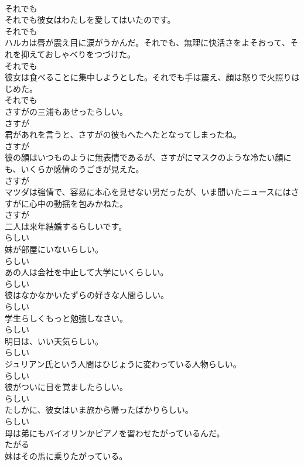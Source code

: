 \documentclass[8pt]{extreport}
\begin{document}
\begin{CJK}{UTF8}{min}
\\	それでも
\\	それでも彼女はわたしを愛してはいたのです。	
\\	それでも
\\	ハルカは唇が震え目に涙がうかんだ。それでも、無理に快活さをよそおって、それを抑えておしゃべりをつづけた。	
\\	それでも
\\	彼女は食べることに集中しようとした。それでも手は震え、顔は怒りで火照りはじめた。	
\\	それでも
\\	さすがの三浦もあせったらしい。	
\\	さすが
\\	君があれを言うと、さすがの彼もへたへたとなってしまったね。	
\\	さすが
\\	彼の顔はいつものように無表情であるが、さすがにマスクのような冷たい顔にも、いくらか感情のうごきが見えた。	
\\	さすが
\\	マツダは強情で、容易に本心を見せない男だったが、いま聞いたニュースにはさすがに心中の動揺を包みかねた。	
\\	さすが
\\	二人は来年結婚するらしいです。	
\\	らしい
\\	妹が部屋にいないらしい。	
\\	らしい
\\	あの人は会社を中止して大学にいくらしい。	
\\	らしい
\\	彼はなかなかいたずらの好きな人間らしい。	
\\	らしい
\\	学生らしくもっと勉強しなさい。	
\\	らしい
\\	明日は、いい天気らしい。	
\\	らしい
\\	ジュリアン氏という人間はひじょうに変わっている人物らしい。	
\\	らしい
\\	彼がついに目を覚ましたらしい。	
\\	らしい
\\	たしかに、彼女はいま旅から帰ったばかりらしい。	
\\	らしい
\\	母は弟にもバイオリンかピアノを習わせたがっているんだ。	
\\	たがる
\\	妹はその馬に乗りたがっている。	

\end{CJK}
\end{document}
